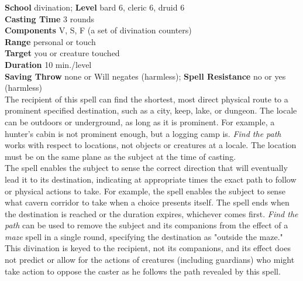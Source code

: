 \textbf{School }divination; \textbf{Level }bard 6, cleric 6, druid 6\\
\textbf{Casting Time }3 rounds\\
\textbf{Components }V, S, F (a set of divination counters)\\
\textbf{Range }personal or touch\\
\textbf{Target }you or creature touched\\
\textbf{Duration }10 min./level\\
\textbf{Saving Throw }none or Will negates (harmless); \textbf{Spell Resistance }no or yes (harmless)\\
The recipient of this spell can find the shortest, most direct physical route to a prominent specified destination, such as a city, keep, lake, or dungeon. The locale can be outdoors or underground, as long as it is prominent. For example, a hunter's cabin is not prominent enough, but a logging camp is. \textit{Find the path }works with respect to locations, not objects or creatures at a locale. The location must be on the same plane as the subject at the time of casting.\\
The spell enables the subject to sense the correct direction that will eventually lead it to its destination, indicating at appropriate times the exact path to follow or physical actions to take. For example, the spell enables the subject to sense what cavern corridor to take when a choice presents itself\textit{. }The spell ends when the destination is reached or the duration expires, whichever comes first. \textit{Find the path }can be used to remove the subject and its companions from the effect of a \textit{maze }spell in a single round, specifying the destination as "outside the maze." This divination is keyed to the recipient, not its companions, and its effect does not predict or allow for the actions of creatures (including guardians) who might take action to oppose the caster as he follows the path revealed by this spell.\\
